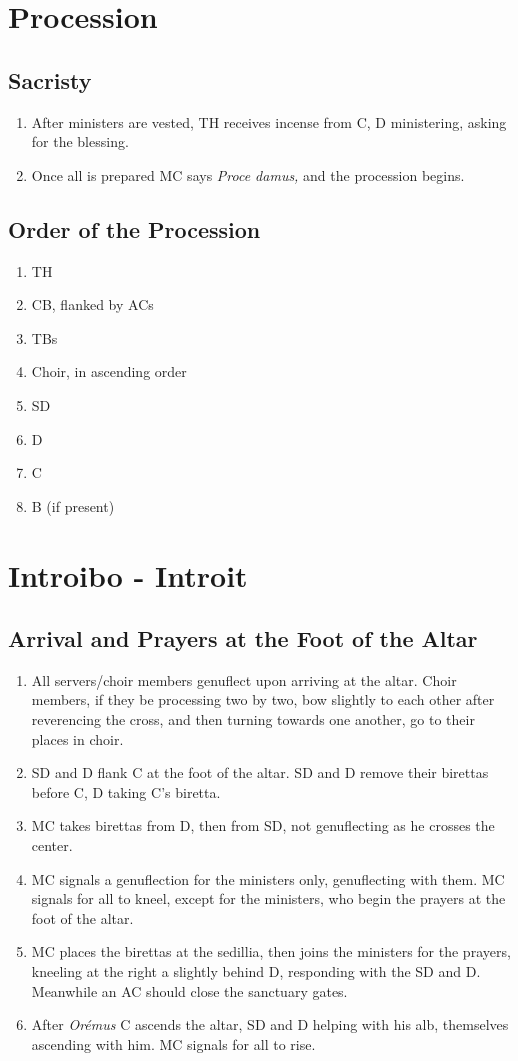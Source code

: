 \documentclass[letterpaper, twocolumn]{article}
\begin{document}
	\section*{Procession}
	\subsection*{Sacristy}
	\begin{enumerate}
		\item After ministers are vested, TH receives incense from C, D ministering, asking for the blessing.
		\item Once all is prepared MC says \textit{Proce damus,} and the procession begins.
	\end{enumerate}
	\subsection*{Order of the Procession}
	\begin{enumerate}
		\item TH
		\item CB, flanked by ACs
		\item TBs
		\item Choir, in ascending order
		\item SD
		\item D
		\item C
		\item B (if present)
	\end{enumerate}
	\section*{Introibo - Introit}
		\subsection*{Arrival and Prayers at the Foot of the Altar}
		\begin{enumerate}
			\item All servers/choir members genuflect upon arriving at the altar. Choir members, if they be processing two by two, bow slightly to each other after reverencing the cross, and then turning towards one another, go to their places in choir.
			\item SD and D flank C at the foot of the altar. SD and D remove their birettas before C, D taking C's biretta.
			\item MC takes birettas from D, then from SD, not genuflecting as he crosses the center.
			\item MC signals a genuflection for the ministers only, genuflecting with them. MC signals for all to kneel, except for the ministers, who begin the prayers at the foot of the altar.
			\item MC places the birettas at the sedillia, then joins the ministers for the prayers, kneeling at the right a slightly behind D, responding with the SD and D. Meanwhile an AC should close the sanctuary gates.
			\item After \textit{Orémus} C ascends the altar, SD and D helping with his alb, themselves ascending with him. MC signals for all to rise.
		\end{enumerate}
\end{document}

